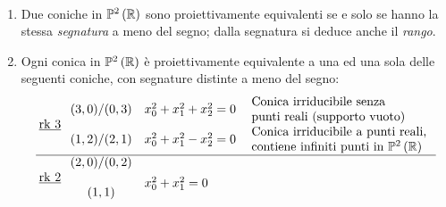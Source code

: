 \begin{theorema}~{}
	\begin{enumerate}
	\item	 Due coniche in $\proj[2]{\realset}$ sono proiettivamente equivalenti se e solo se hanno la stessa \textit{segnatura} a meno del segno; dalla segnatura si deduce anche il \textit{rango}.
	\item	Ogni conica in $\proj[2]{\realset}$ è proiettivamente equivalente a una ed una sola delle seguenti coniche, con segnature distinte a meno del segno:
	\begin{equation*}
		\arraycolsep=2.5pt
		\begin{array}{ccll}
			\underline{\rk 3} & \begin{array}{l}
					(3,0)/(0,3) \\
					\\
					(1,2)/(2,1)
				\end{array} & \begin{array}{l}
				x_0^2+x_1^2+x_2^2=0\\
				\\
				x_0^2+x_1^2-x_2^2=0\\
			\end{array}
				 & \begin{array}{l}
			\begin{array}{l}
				\text{Conica irriducibile senza} \\
				\text{punti reali (supporto vuoto)}
			\end{array} \\
			\begin{array}{l}
				\text{Conica irriducibile a punti reali,} \\
				\text{contiene infiniti punti in }\proj[2]{\realset}
			\end{array}
		\end{array}\\\hline %
		\underline{\rk 2} &\begin{array}{c}
		(2,0)/(0,2) \\
		\\
		(1,1)
		\end{array} &\begin{array}{l}
		\\[-1mm]
		x_0^2+x_1^2=0 \\

\end{array}
\end{array}
\end{equation*}
\end{enumerate}
\end{theorema}
